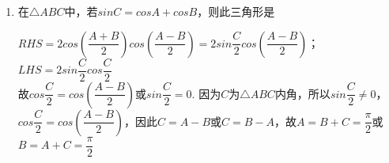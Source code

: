 \begin{enumerate}
\begin{enumerate}
\begin{jieda}
            因此$\dfrac{16}{5}cos(\dfrac{\alpha - \beta}{2}) = \dfrac{7}{25} + 2cos^2(\dfrac{\alpha - \beta}{2}) - 1 = 2cos^2(\dfrac{\alpha - \beta}{2}) - \dfrac{18}{25}$\\
            解得$cos(\dfrac{\alpha - \beta}{2}) = -\dfrac{1}{5}$或$\dfrac{9}{5}$（舍）
        \end{jieda}
        \item 在$\triangle ABC$中，若$sinC = cosA + cosB$，则此三角形是
        \begin{jieda}
            $RHS = 2cos(\dfrac{A+B}{2})cos(\dfrac{A-B}{2}) = 2sin\dfrac{C}{2}cos(\dfrac{A-B}{2})$；$LHS = 2sin\dfrac{C}{2}cos\dfrac{C}{2}$ \\
            故$cos\dfrac{C}{2} = cos(\dfrac{A-B}{2})$或$sin\dfrac{C}{2} = 0$. 因为$C$为$\triangle ABC$内角，所以$sin\dfrac{C}{2} \neq 0$，$cos\dfrac{C}{2} = cos(\dfrac{A-B}{2})$，因此$C = A - B$或$C = B - A$，故$A = B+C = \dfrac{\pi}{2}$或$B = A+C = \dfrac{\pi}{2}$
        \end{jieda}
            

\end{enumerate}
\end{enumerate}
